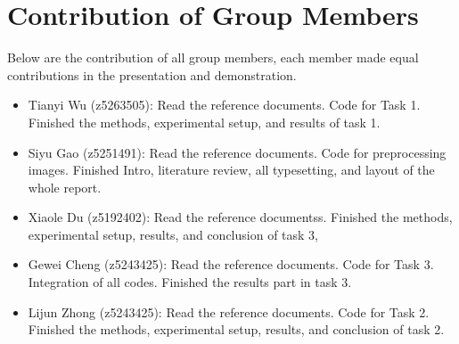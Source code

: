 \documentclass[conference]{IEEEtran}
\begin{document}
\section{Contribution of Group Members}
Below are the contribution of all group members, each member made equal contributions in the presentation and demonstration. 
\begin{itemize}

\item Tianyi Wu (z5263505):
Read the reference documents. 
Code for Task 1. 
Finished the methods, experimental setup, and results of task 1. \\

\item Siyu Gao (z5251491):
Read the reference documents. 
Code for preprocessing images. 
Finished Intro, literature review, all typesetting, and layout of the whole report.\\


\item Xiaole Du (z5192402):
Read the reference documentss. 
Finished the methods, experimental setup, results, and conclusion of task 3, \\


\item Gewei Cheng (z5243425):
Read the reference documents. 
Code for Task 3. Integration of all codes.
Finished the results part in task 3.\\


\item Lijun Zhong (z5243425):
Read the reference documents. 
Code for Task 2. 
Finished the methods, experimental setup, results, and conclusion of task 2.\\
\end{itemize}
\end{document}
